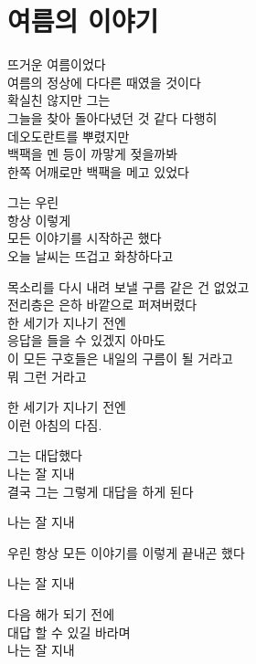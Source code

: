 \begin{article}
\hypertarget{uxc5ecuxb984uxc758-uxc774uxc57cuxae30}{%
\chapter{여름의 이야기}\label{uxc5ecuxb984uxc758-uxc774uxc57cuxae30}}

뜨거운 여름이었다\\
여름의 정상에 다다른 때였을 것이다\\
확실친 않지만 그는\\
그늘을 찾아 돌아다녔던 것 같다 다행히\\
데오도란트를 뿌렸지만\\
백팩을 멘 등이 까맣게 젖을까봐\\
한쪽 어깨로만 백팩을 메고 있었다

그는 우린\\
항상 이렇게\\
모든 이야기를 시작하곤 했다\\
오늘 날씨는 뜨겁고 화창하다고

목소리를 다시 내려 보낼 구름 같은 건 없었고\\
전리층은 은하 바깥으로 퍼져버렸다\\
한 세기가 지나기 전엔\\
응답을 들을 수 있겠지 아마도\\
이 모든 구호들은 내일의 구름이 될 거라고\\
뭐 그런 거라고

한 세기가 지나기 전엔\\
이런 아침의 다짐.

그는 대답했다\\
나는 잘 지내\\
결국 그는 그렇게 대답을 하게 된다

나는 잘 지내

우린 항상 모든 이야기를 이렇게 끝내곤 했다

나는 잘 지내

다음 해가 되기 전에\\
대답 할 수 있길 바라며\\
나는 잘 지내
\end{article}

